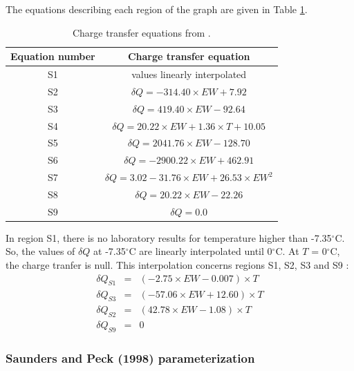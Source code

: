 \noindent
The equations describing each region of the graph are given in Table \ref{tab:eq_saund}.
\begin{table}[h]
  \begin{center}
  \begin{tabular}{|c|c|}
    \hline
    Equation number & Charge transfer equation\\
    \hline
    S1 & values linearly interpolated\\
    \hline
    S2 & $\delta Q = -314.40 \times EW + 7.92$\\
    \hline
    S3 & $\delta Q = 419.40 \times EW - 92.64$\\
    \hline
    S4 & $\delta Q = 20.22 \times EW + 1.36 \times T + 10.05$\\
    \hline
    S5 & $\delta Q = 2041.76  \times EW - 128.70$\\
    \hline
    S6 & $\delta Q = -2900.22 \times EW + 462.91$\\
    \hline
    S7 & $\delta Q = 3.02 - 31.76 \times EW + 26.53 \times EW^{2}$\\
    \hline
    S8 & $\delta Q = 20.22 \times EW - 22.26$\\
    \hline
    S9 & $\delta Q = 0.0$\\
    \hline
  \end{tabular}
  \end{center}
  \caption{\small Charge transfer equations from \citet{Saunders-1991}.}
  \label{tab:eq_saund}
\end{table}
In region S1, there is no laboratory results for temperature higher than -7.35$^{\circ}$C.
So, the values of $\delta Q$ at -7.35$^{\circ}$C are linearly interpolated until 0$^{\circ}$C.
At $T$ = 0$^{\circ}$C, the charge tranfer is null.
This interpolation concerns regions S1, S2, S3 and S9 :
\begin{equation}
  \begin{array}{lcl}
    \delta Q_{S1} & = & (-2.75 \times EW - 0.007) \times T \\
    \delta Q_{S3} & = & (-57.06 \times EW + 12.60) \times T \\
    \delta Q_{S2} & = & (42.78 \times EW - 1.08) \times T \\
    \delta Q_{S9} & = & 0
  \end{array}
\end{equation}

\subsubsection{Saunders and Peck (1998) parameterization}

